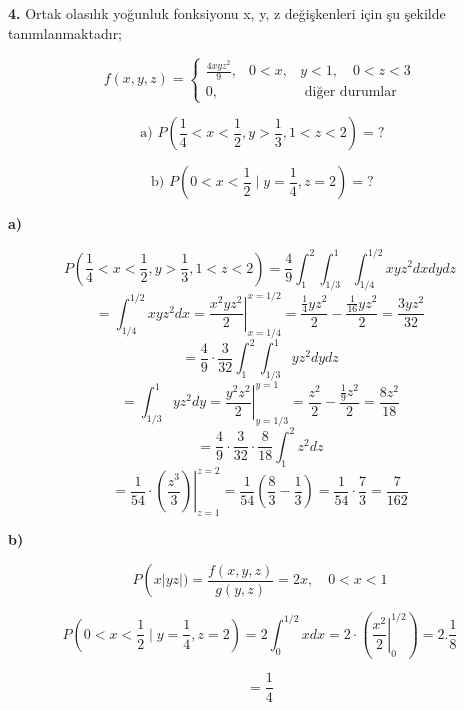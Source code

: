 \documentclass[a4paper,10pt]{article}
\begin{document}
\pagebreak

\textbf{4.} Ortak olasılık yoğunluk fonksiyonu x, y, z değişkenleri için şu şekilde tanımlanmaktadır;

$$f(x, y, z)=\left\{\begin{array}{ccc}
\frac{4 x y z^{2}}{9}, & 0<x, & y<1, \quad 0<z<3 \\
0, & & \text { diğer durumlar }
\end{array}\right.$$

\vspace{0.3cm}

$$\text { a) } P\left(\frac{1}{4} <x<\frac{1}{2}, y>\frac{1}{3}, 1<z<2\right)= ?$$

\vspace{0.3cm}

$$\text { b) } P\left(0<x<\frac{1}{2} \mid y=\frac{1}{4}, z=2\right)=?$$


\vspace{1cm}
\textbf{a)}

$$P\left(\frac{1}{4}<x<\frac{1}{2}, y>\frac{1}{3}, 1<z<2\right)=\frac{4}{9} \int_{1}^{2} \int_{1 / 3}^{1} \int_{1 / 4}^{1/2} x y z^{2} d x d y d z$$
\vspace{0.2cm}
$$=\int_{1 / 4}^{1 / 2} x y z^{2} d x=\left.\frac{x^{2} y z^{2}}{2}\right|_{x=1 / 4} ^{x=1 / 2}=\frac{\frac{1}{4} y z^{2}}{2}-\frac{\frac{1}{16} y z^{2}}{2}=\frac{3 y z^{2}}{32}$$
\vspace{0.2cm}
$$=\frac{4}{9} \cdot \frac{3}{32} \int_{1}^{2} \int_{1 / 3}^{1} y z^{2} d y d z$$
\vspace{0.2cm}
$$=\int_{1 / 3}^{1} y z^{2} d y=\left.\frac{y^{2} z^{2}}{2}\right|_{y=1 / 3} ^{y=1}=\frac{z^{2}}{2}-\frac{\frac{1}{9} z^{2}}{2}=\frac{8 z^{2}}{18}$$
\vspace{0.2cm}
$$=\frac{4}{9} \cdot \frac{3}{32} \cdot \frac{8}{18} \int_{1}^{2} z^{2} d z$$
\vspace{0.2cm}
$$=\left.\frac{1}{54} \cdot\left(\frac{z^{3}}{3}\right)\right|_{z=1} ^{z=2}=\frac{1}{54}\left(\frac{8}{3}-\frac{1}{3}\right)=\frac{1}{54} \cdot \frac{7}{3}=\frac{7}{162}$$


\vspace{1cm}
\textbf{b)}

$$P\left(x|y z|)=\frac{f(x, y, z)}{g(y, z)}=2 x, \quad 0<x<1\right.$$

$$P\left(0<x<\frac{1}{2} \mid y=\frac{1}{4}, z=2\right)=2 \int_{0}^{1/2} x d x=2 \cdot\left(\left.\frac{x^{2}}{2}\right|_{0} ^{1 / 2}\right)=2 . \frac{1}{8}$$

$$=\frac{1}{4}$$
\end{document}
